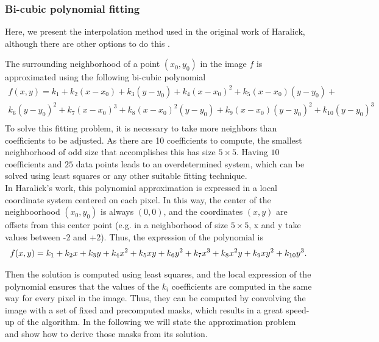 \documentclass{ipol}
\numberwithin{equation}{section}
\numberwithin{table}{section}
\begin{document}

\subsubsection{Bi-cubic polynomial fitting}
\label{sec:bicubic}

Here, we present the interpolation method used in the original work of Haralick, although there are other options to do this \cite{getreuer}. 

The surrounding neighborhood of a point $(x_0,y_0)$ in the image $f$ is approximated using the following bi-cubic polynomial
\begin{align}
	\label{eq:bicubic:long}
	f(x,y) = k_1 + k_2 (x-x_0) + k_3(y-y_0) + k_4(x-x_0)^2 + k_5(x-x_0)(y-y_0)  +\\
	 k_6(y-y_0) ^2 + k_7(x-x_0)^3 + k_8(x-x_0)^2(y-y_0)  + k_9(x-x_0)(y-y_0) ^2 + k_{10}(y-y_0) ^3 \\
\end{align}
To solve this fitting problem, it is necessary to take more neighbors than coefficients to be adjusted. As there are 10 coefficients to compute, the smallest neighborhood of odd size that accomplishes this has size $5\times5$. Having $10$ coefficients and $25$ data 
points leads to an overdetermined system, which can be solved using least squares or any other suitable fitting technique.\\

In Haralick's work, this polynomial approximation is expressed in a local coordinate system centered on each pixel. In this way, the center of the neighboorhood $(x_0,y_0)$ is always $(0,0)$, and the coordinates $(x, y)$ are offsets from this center point (e.g. in a neighborhood of size $5\times5$, x and y take values between -2 and +2). Thus, the expression of the polynomial is\\

\begin{equation}
	\label{eq:bicubic}
	f(x,y) = k_1 + k_2x + k_3y + k_4x^2 + k_5xy + k_6y^2 + k_7x^3 + k_8x^2y + k_9xy^2 + k_{10}y^3. \\
\end{equation}


Then the solution is computed using least squares, and the local expression of the polynomial ensures that the values of the $k_i$ coefficients are computed in the same way for every pixel in the image. Thus, they can be computed by convolving the image with a set of fixed and precomputed masks, which results in a great speed-up of the algorithm. In the following we will state the approximation problem and show how to derive those masks from its solution.\\
\end{document}
